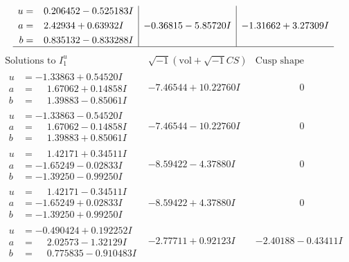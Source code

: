 \documentclass[1p]{elsarticle_modified}
\theoremstyle{definition}
\newcommand{\I}{\sqrt{-1}}
\begin{document}
$$\begin{array}{c|c|c}
\begin{aligned}
u &= \phantom{-}0.206452 - 0.525183 I \\
a &= \phantom{-}2.42934 + 0.63932 I \\
b &= \phantom{-}0.835132 - 0.833288 I\end{aligned}
 & -0.36815 - 5.85720 I & -1.31662 + 3.27309 I\\
 \hline 
 \end{array}$$\newpage$$\begin{array}{c|c|c}  
\text{Solutions to }I^u_{1}& \I (\text{vol} + \sqrt{-1}CS) & \text{Cusp shape}\\
 \hline 
\begin{aligned}
u &= -1.33863 + 0.54520 I \\
a &= \phantom{-}1.67062 + 0.14858 I \\
b &= \phantom{-}1.39883 - 0.85061 I\end{aligned}
 & -7.46544 + 10.22760 I & \phantom{-0.000000 } 0 \\ \hline\begin{aligned}
u &= -1.33863 - 0.54520 I \\
a &= \phantom{-}1.67062 - 0.14858 I \\
b &= \phantom{-}1.39883 + 0.85061 I\end{aligned}
 & -7.46544 - 10.22760 I & \phantom{-0.000000 } 0 \\ \hline\begin{aligned}
u &= \phantom{-}1.42171 + 0.34511 I \\
a &= -1.65249 - 0.02833 I \\
b &= -1.39250 - 0.99250 I\end{aligned}
 & -8.59422 - 4.37880 I & \phantom{-0.000000 } 0 \\ \hline\begin{aligned}
u &= \phantom{-}1.42171 - 0.34511 I \\
a &= -1.65249 + 0.02833 I \\
b &= -1.39250 + 0.99250 I\end{aligned}
 & -8.59422 + 4.37880 I & \phantom{-0.000000 } 0 \\ \hline\begin{aligned}
u &= -0.490424 + 0.192252 I \\
a &= \phantom{-}2.02573 - 1.32129 I \\
b &= \phantom{-}0.775835 - 0.910483 I\end{aligned}
 & -2.77711 + 0.92123 I & -2.40188 - 0.43411 I \\ \hline\begin{aligned}

\end{aligned}
\end{array}$$
\end{document}
